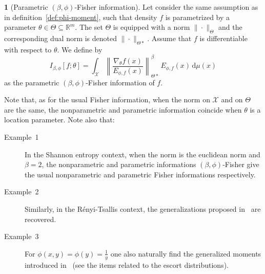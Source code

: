 \documentclass[english,sort&compress]{elsarticle}
\theoremstyle{definition}
\newtheorem{defn}{\protect\definitionname}
\theoremstyle{plain}
\theoremstyle{plain}
\providecommand{\definitionname}{Definition}
\def\dmu{\mathrm{d}\mu}
\def\Rset{\mathbb{R}}
\def\X{\mathcal{X}}
\begin{document}
\begin{defn}[Parametric $(\beta,\phi)$-Fisher information]\label{def:p-phi-Fisher}
  Let consider  the same assumption as  in definition~\ref{def:phi-moment}, such
  that density $f$  is parametrized by a parameter $\theta  \in \Theta \subseteq
  \Rset^m$.  The set $\Theta$ is equipped with a norm $\| \cdot \|_{\Theta}$ and
  the corresponding dual  norm is denoted $\| \cdot  \|_{\Theta*}$.  Assume that
  $f$ is differentiable with respect to $\theta$. We define by
  \begin{equation}\label{eq:p-phi-Fisher}
  I_{\beta,\phi}[f;\theta] = \int_\X \left\| \frac{\nabla_\theta
  f(x)}{E_{\phi,f}(x)} \right\|_{\Theta*}^\beta \, E_{\phi,f}(x) \, \dmu(x)
  \end{equation}
  as the parametric $(\beta,\phi)$-Fisher information of $f$.
\end{defn}
%
Note that,  as for the usual  Fisher information, when  the norm on $\X$  and on
$\Theta$  are the same,  the nonparametric  and parametric  information coincide
when $\theta$  is a location  parameter. Note also that:
%
\begin{description}%
\item[Example~1]    In   the  Shannon entropy
context, when the norm is the  euclidean norm and $\beta = 2$, the nonparametric
and parametric  informations $(\beta,\phi)$-Fisher give  the usual nonparametric
and   parametric   Fisher   informations   respectively.
%
\item[Example~2] Similarly, in  the R\'enyi-Tsallis context, the generalizations
  proposed in~\cite{Ber12:06_1, Ber12:06_2, Ber13} are recovered.
%
\item[Example~3] For $\phi(x,y) = \phi(y) = \frac{1}{y}$ one also naturally find
  the generalized moments  introduced in~\cite{TsaMen98,MarNic00} (see the items
  related to the escort distributions).
\end{description}



\
\end{document}
